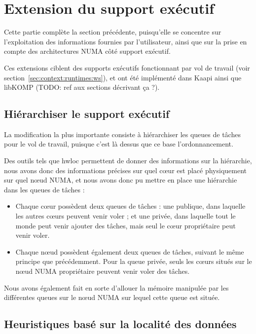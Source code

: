 \section{Extension du support exécutif}\label{sec:openmp:runtime}

Cette partie complète la section précédente, puisqu'elle se concentre sur l'exploitation des informations fournies par l'utilisateur, ainsi que sur la prise en compte des architectures NUMA côté support exécutif.

Ces extensions ciblent des supports exécutifs fonctionnant par vol de travail (voir section~\ref{sec:context:runtimes:ws}), et ont été implémenté dans Kaapi ainsi que libKOMP (TODO: ref aux sections décrivant ça ?).

\subsection{Hiérarchiser le support exécutif}

La modification la plus importante consiste à hiérarchiser les queues de tâches pour le vol de travail, puisque c'est là dessus que ce base l'ordonnancement.

Des outils tels que hwloc permettent de donner des informations sur la hiérarchie, nous avons donc des informations précises sur quel cœur est placé physiquement sur quel nœud NUMA, et nous avons donc pu mettre en place une hiérarchie dans les queues de tâches :

\begin{itemize}
  \item Chaque cœur possèdent deux queues de tâches : une publique, dans laquelle les autres cœurs peuvent venir voler ; et une privée, dans laquelle tout le monde peut venir ajouter des tâches, mais seul le cœur propriétaire peut venir voler.
  \item Chaque nœud possèdent également deux queues de tâches, suivant le même principe que précédemment. Pour la queue privée, seuls les cœurs situés sur le nœud NUMA propriétaire peuvent venir voler des tâches.
\end{itemize}

Nous avons également fait en sorte d'allouer la mémoire manipulée par les différentes queues sur le nœud NUMA sur lequel cette queue est située.



\subsection{Heuristiques basé sur la localité des données}\label{sec:contrib:ws:heuristics}

